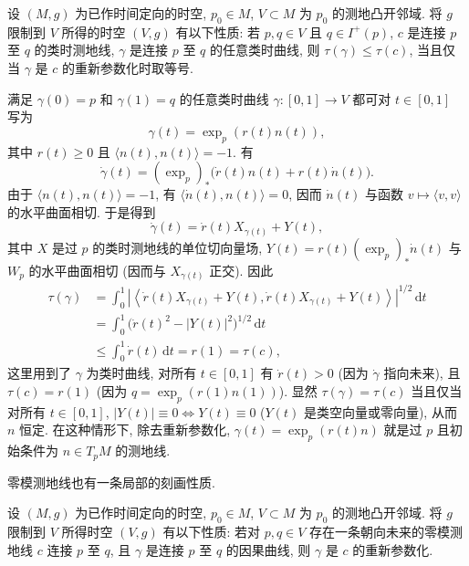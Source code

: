 \begin{RiemannProposition}\label{prop:timelike-geodesic-maximizes-proper-time-locally}
设 $(M,g)$ 为已作时间定向的时空, $p_0\in M$, $V\subset M$ 为 $p_0$ 的测地凸开邻域. 将 $g$ 限制到 $V$ 所得的时空 $(V,g)$ 有以下性质: 若 $p,q\in V$ 且 $q\in I^+(p)$, $c$ 是连接 $p$ 至 $q$ 的类时测地线, $\gamma$ 是连接 $p$ 至 $q$ 的任意类时曲线, 则 $\tau(\gamma)\leq\tau(c)$, 当且仅当 $\gamma$ 是 $c$ 的重新参数化时取等号.
\end{RiemannProposition}

\begin{RiemannProof}
满足 $\gamma(0)=p$ 和 $\gamma(1)=q$ 的任意类时曲线 $\gamma:[0,1]\to V$ 都可对 $t\in[0,1]$ 写为
\[
  \gamma(t)=\exp_p(r(t)n(t)),
\]
其中 $r(t)\geq0$ 且 $\langle n(t),n(t)\rangle=-1$. 有
\[
  \dot\gamma(t)=(\exp_p)_*\bigl(\dot r(t)n(t)+r(t)\dot n(t)\bigr).
\]
由于 $\langle n(t),n(t)\rangle=-1$, 有 $\langle\dot n(t),n(t)\rangle=0$, 因而 $\dot n(t)$ 与函数 $v\mapsto\langle v,v\rangle$ 的水平曲面相切. 于是得到
\[
  \dot\gamma(t)=\dot r(t)X_{\gamma(t)}+Y(t),
\]
其中 $X$ 是过 $p$ 的类时测地线的单位切向量场, $Y(t)=r(t)(\exp_p)_*\dot n(t)$ 与 $W_p$ 的水平曲面相切 (因而与 $X_{\gamma(t)}$ 正交). 因此
\begin{align*}
  \tau(\gamma)
  &=\int_0^1\left|\left\langle
      \dot r(t)X_{\gamma(t)}+Y(t),\dot r(t)X_{\gamma(t)}+Y(t)
      \right\rangle\right|^{1/2}\,\mathrm{d}t\\
  &=\int_0^1\bigl(\dot r(t)^2-|Y(t)|^2\bigr)^{1/2}\,\mathrm{d}t\\
  &\leq\int_0^1\dot r(t)\,\mathrm{d}t=r(1)=\tau(c),
\end{align*}
这里用到了 $\gamma$ 为类时曲线, 对所有 $t\in[0,1]$ 有 $\dot r(t)>0$ (因为 $\dot\gamma$ 指向未来), 且 $\tau(c)=r(1)$ (因为 $q=\exp_p(r(1)n(1))$). 显然 $\tau(\gamma)=\tau(c)$ 当且仅当对所有 $t\in[0,1]$, $|Y(t)|\equiv0\iff Y(t)\equiv0$ ($Y(t)$ 是类空向量或零向量), 从而 $n$ 恒定. 在这种情形下, 除去重新参数化, $\gamma(t)=\exp_p(r(t)n)$ 就是过 $p$ 且初始条件为 $n\in T_pM$ 的测地线.
\end{RiemannProof}

零模测地线也有一条局部的刻画性质.

\begin{RiemannProposition}\label{prop:uniqueness-of-causal-curves-on-local-light-cone}
设 $(M,g)$ 为已作时间定向的时空, $p_0\in M$, $V\subset M$ 为 $p_0$ 的测地凸开邻域. 将 $g$ 限制到 $V$ 所得时空 $(V,g)$ 有以下性质: 若对 $p,q\in V$ 存在一条朝向未来的零模测地线 $c$ 连接 $p$ 至 $q$, 且 $\gamma$ 是连接 $p$ 至 $q$ 的因果曲线, 则 $\gamma$ 是 $c$ 的重新参数化.
\end{RiemannProposition}

